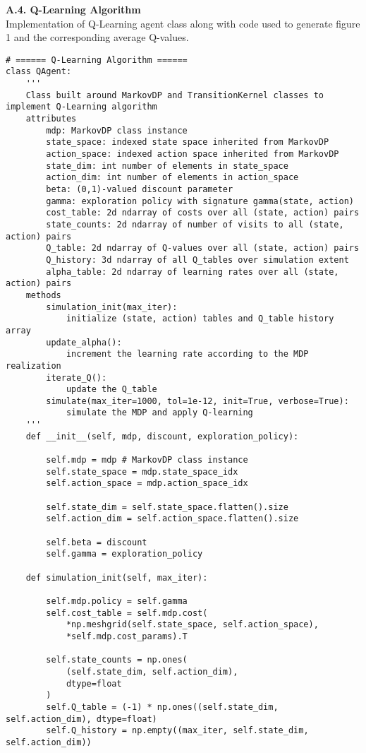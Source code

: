 \documentclass[10pt]{article}
\newcommand{\1}[1]{\mathbbm{1}_{#1}}
\begin{document}
    {\bf A.4. Q-Learning Algorithm}\\[5pt]
    Implementation of Q-Learning agent class along with code used to generate figure 1 and the corresponding average
    Q-values.
    \begin{verbatim}
# ====== Q-Learning Algorithm ======
class QAgent:
    '''
    Class built around MarkovDP and TransitionKernel classes to implement Q-Learning algorithm
    attributes
        mdp: MarkovDP class instance
        state_space: indexed state space inherited from MarkovDP
        action_space: indexed action space inherited from MarkovDP
        state_dim: int number of elements in state_space
        action_dim: int number of elements in action_space
        beta: (0,1)-valued discount parameter
        gamma: exploration policy with signature gamma(state, action)
        cost_table: 2d ndarray of costs over all (state, action) pairs
        state_counts: 2d ndarray of number of visits to all (state, action) pairs
        Q_table: 2d ndarray of Q-values over all (state, action) pairs
        Q_history: 3d ndarray of all Q_tables over simulation extent
        alpha_table: 2d ndarray of learning rates over all (state, action) pairs
    methods
        simulation_init(max_iter):
            initialize (state, action) tables and Q_table history array
        update_alpha():
            increment the learning rate according to the MDP realization
        iterate_Q():
            update the Q_table
        simulate(max_iter=1000, tol=1e-12, init=True, verbose=True):
            simulate the MDP and apply Q-learning
    '''
    def __init__(self, mdp, discount, exploration_policy):

        self.mdp = mdp # MarkovDP class instance
        self.state_space = mdp.state_space_idx 
        self.action_space = mdp.action_space_idx

        self.state_dim = self.state_space.flatten().size
        self.action_dim = self.action_space.flatten().size

        self.beta = discount
        self.gamma = exploration_policy
    
    def simulation_init(self, max_iter):

        self.mdp.policy = self.gamma
        self.cost_table = self.mdp.cost(
            *np.meshgrid(self.state_space, self.action_space),
            *self.mdp.cost_params).T
        
        self.state_counts = np.ones(
            (self.state_dim, self.action_dim),
            dtype=float
        )
        self.Q_table = (-1) * np.ones((self.state_dim, self.action_dim), dtype=float)
        self.Q_history = np.empty((max_iter, self.state_dim, self.action_dim))


\end{verbatim}
\end{document}
